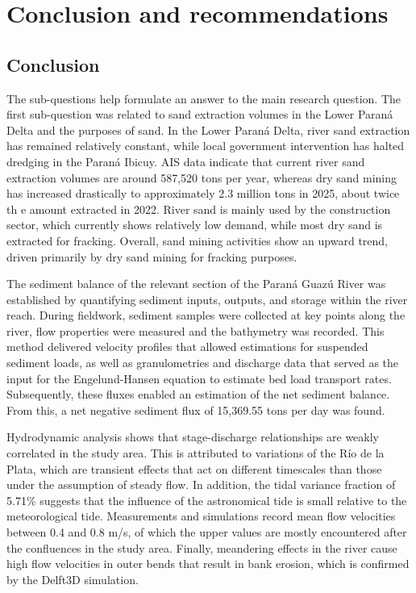 \chapter{Conclusion and recommendations}
\label{chapter:conclusion}
\section{Conclusion}
The sub-questions help formulate an answer to the main research question. The first sub-question was related to sand extraction volumes in the Lower Paraná Delta and the purposes of sand. In the Lower Paraná Delta, river sand extraction has remained relatively constant, while local government intervention has halted dredging in the Paraná Ibicuy. AIS data indicate that current river sand extraction volumes are around 587,520 tons per year, whereas dry sand mining has increased drastically to approximately 2.3 million tons in 2025, about twice th
e amount extracted in 2022. River sand is mainly used by the construction sector, which currently shows relatively low demand, while most dry sand is extracted for fracking. Overall, sand mining activities show an upward trend, driven primarily by dry sand mining for fracking purposes.

The sediment balance of the relevant section of the Paraná Guazú River was established by quantifying sediment inputs, outputs, and storage within the river reach. During fieldwork, sediment samples were collected at key points along the river, flow properties were measured and the bathymetry was recorded. This method delivered velocity profiles that allowed estimations for suspended sediment loads, as well as granulometries and discharge data that served as the input for the Engelund-Hansen equation to estimate bed load transport rates. Subsequently, these fluxes enabled an estimation of the net sediment balance. From this, a net negative sediment flux of 15,369.55 tons per day was found.


Hydrodynamic analysis shows that stage-discharge relationships are weakly correlated in the study area. This is attributed to variations of the Río de la Plata, which are transient effects that act on different timescales than those under the assumption of steady flow. In addition, the tidal variance fraction of 5.71\% suggests that the influence of the astronomical tide is small relative to the meteorological tide. Measurements and simulations record mean flow velocities between 0.4 and 0.8 m/s, of which the upper values are mostly encountered after the confluences in the study area. Finally, meandering effects in the river cause high flow velocities in outer bends that result in bank erosion, which is confirmed by the Delft3D simulation. 

